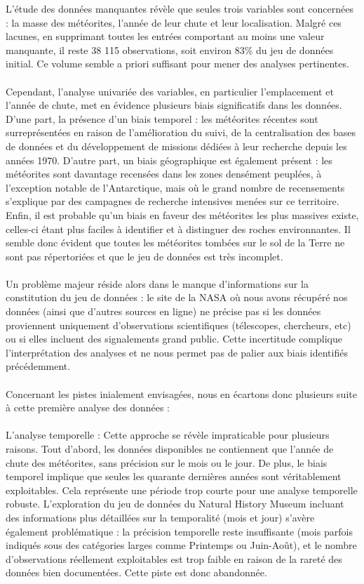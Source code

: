 \documentclass[12pt]{article}
\begin{document}
L’étude des données manquantes révèle que seules trois variables sont concernées : la masse des météorites, l’année de leur chute et leur localisation. Malgré ces lacunes, en supprimant toutes les entrées comportant au moins une valeur manquante, il reste 38 115 observations, soit environ 83\% du jeu de données initial. Ce volume semble a priori suffisant pour mener des analyses pertinentes.\\
\\
Cependant, l’analyse univariée des variables, en particulier l’emplacement et l’année de chute,  met en évidence plusieurs biais significatifs dans les données. D’une part, la présence d'un biais temporel : les météorites récentes sont surreprésentées en raison de l’amélioration du suivi, de la centralisation des bases de données et du développement de missions dédiées à leur recherche depuis les années 1970. D’autre part, un biais géographique est également présent : les météorites sont davantage recensées dans les zones densément peuplées, à l’exception notable de l’Antarctique, mais où  le grand nombre de recensements s'explique par des campagnes de recherche intensives menées sur ce territoire. Enfin, il est probable qu’un biais en faveur des météorites les plus massives existe, celles-ci étant plus faciles à identifier et à distinguer des roches environnantes. Il semble donc évident que toutes les météorites tombées sur le sol de la Terre ne sont pas répertoriées et que le jeu de données est très incomplet.\\
\\
Un problème majeur réside alors dans le manque d’informations sur la constitution du jeu de données : le site de la NASA où nous avons récupéré nos données (ainsi que d’autres sources en ligne) ne précise pas si les données proviennent uniquement d’observations scientifiques (télescopes, chercheurs, etc) ou si elles incluent des signalements grand public. Cette incertitude complique l’interprétation des analyses et ne nous permet pas de palier aux biais identifiés précédemment.\\
\\
Concernant les pistes inialement envisagées, nous en écartons donc plusieurs suite à cette première analyse des données :\\
\\
 L'analyse temporelle : Cette approche se révèle impraticable pour plusieurs raisons. Tout d’abord, les données disponibles ne contiennent que l’année de chute des météorites, sans précision sur le mois ou le jour. De plus, le biais temporel implique que seules les quarante dernières années sont véritablement exploitables. Cela représente une période trop courte pour une analyse temporelle robuste. L'exploration du jeu de données du Natural History Museum \cite{MetCat} incluant des informations plus détaillées sur la temporalité (mois et jour) s'avère également problématique : la précision temporelle reste insuffisante (mois parfois indiqués sous des catégories larges comme Printemps ou Juin-Août), et le nombre d’observations réellement exploitables est trop faible en raison de la rareté des données bien documentées. Cette piste est donc abandonnée.\\
\end{document}
